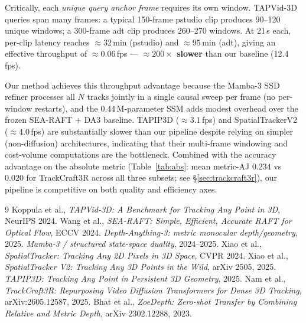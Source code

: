\documentclass[11pt,a4paper]{article}
\begin{document}
Critically, each \emph{unique query anchor frame} requires its own window.
TAPVid-3D queries span many frames: a typical 150-frame pstudio clip produces
90--120 unique windows; a 300-frame adt clip produces 260--270 windows.
At 21\,s each, per-clip latency reaches ${\approx}32$\,min (pstudio) and ${\approx}95$\,min (adt),
giving an effective throughput of ${\approx}0.06$\,fps --- \textbf{${\approx}200\times$ slower}
than our baseline (12.4\,fps).

Our method achieves this throughput advantage because the Mamba-3 SSD refiner processes
all $N$ tracks jointly in a single causal sweep per frame (no per-window restarts),
and the 0.44\,M-parameter SSM adds modest overhead over the frozen SEA-RAFT $+$ DA3 baseline.
TAPIP3D (${\approx}3.1$\,fps) and SpatialTrackerV2 (${\approx}4.0$\,fps) are substantially
slower than our pipeline despite relying on simpler (non-diffusion) architectures,
indicating that their multi-frame windowing and cost-volume computations are the bottleneck.
Combined with the accuracy advantage on the absolute metric
(Table~\ref{tab:abs}: mean metric-AJ $0.234$ vs $0.020$ for TrackCraft3R across all three subsets;
see \S\ref{sec:trackcraft3r}),
our pipeline is competitive on both quality and efficiency axes.

\begin{thebibliography}{9}
 Koppula et al., \textit{TAPVid-3D: A Benchmark for Tracking Any Point in 3D}, NeurIPS 2024.
 Wang et al., \textit{SEA-RAFT: Simple, Efficient, Accurate RAFT for Optical Flow}, ECCV 2024.
 \textit{Depth-Anything-3: metric monocular depth/geometry}, 2025.
 \textit{Mamba-3 / structured state-space duality}, 2024--2025.
 Xiao et al., \textit{SpatialTracker: Tracking Any 2D Pixels in 3D Space}, CVPR 2024.
 Xiao et al., \textit{SpatialTracker V2: Tracking Any 3D Points in the Wild}, arXiv 2505, 2025.
 \textit{TAPIP3D: Tracking Any Point in Persistent 3D Geometry}, 2025.
 Nam et al., \textit{TrackCraft3R: Repurposing Video Diffusion Transformers for Dense 3D Tracking}, arXiv:2605.12587, 2025.
 Bhat et al., \textit{ZoeDepth: Zero-shot Transfer by Combining Relative and Metric Depth}, arXiv 2302.12288, 2023.
\end{thebibliography}
\end{document}
